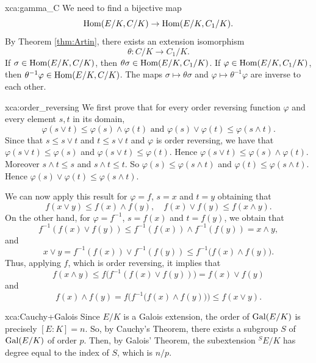 \begin{sol}{xca:gamma_C}
We need to find a bijective map 
\[
\operatorname{Hom}(E/K,C/K)\to\operatorname{Hom}(E/K,C_1/K).
\]
By Theorem \ref{thm:Artin}, there exists an extension isomorphism 
\[
  \theta:C/K \to C_1/K. 
\]
If $\sigma\in\operatorname{Hom}(E/K,C/K)$, then $\theta\sigma\in\operatorname{Hom}(E/K,C_1/K)$. 
If $\varphi\in\operatorname{Hom}(E/K,C_1/K)$, then $\theta^{-1}\varphi\in\operatorname{Hom}(E/K,C/K)$. The 
maps $\sigma\mapsto\theta\sigma$ and 
$\varphi\mapsto\theta^{-1}\varphi$ are inverse to each other. 
\end{sol}

\begin{sol}{xca:order_reversing}
    We first prove that for every order
    reversing function $\varphi$
    and every element $s,t$ in its domain,
    \[
    \varphi(s\vee t)\leq \varphi(s)\wedge \varphi(t) \text{ and }
    \varphi(s)\vee \varphi(t)\leq \varphi(s\wedge t).
    \]
    Since that $s\leq s\vee t$
    and $t\leq s\vee t$ and $\varphi$
    is order reversing,
    we have that $\varphi(s\vee t)\leq \varphi(s)$ 
    and $\varphi(s\vee t)\leq \varphi(t)$.
    Hence $\varphi(s\vee t)\leq \varphi(s)\wedge \varphi(t).$
    Moreover $s\wedge t\leq s$
    and $s\wedge t\leq t$.
    So $\varphi(s)\leq \varphi(s\wedge t)$ and $\varphi(t)\leq \varphi(s\wedge t)$.
    Hence 
    $\varphi(s)\vee \varphi(t)\leq \varphi(s\wedge t).$

    We can now apply this result
    for $\varphi=f$, $s=x$ and $t=y$
    obtaining that
    \[
    f(x\vee y)\leq f(x)\wedge f(y), \quad
    f(x)\vee f(y)\leq f(x\wedge y).
    \]
    On the other hand, for $\varphi=f^{-1}$, 
    $s=f(x)$ and $t=f(y)$,
    we obtain that 
    \[
    f^{-1}(f(x)\vee f(y))\leq
    f^{-1}(f(x))\wedge f^{-1}(f(y))=
    x\wedge y,
    \]
    and
    \[
    x\vee y=f^{-1}(f(x))\vee f^{-1}(f(y))\leq f^{-1}\big(f(x)\wedge f(y)\big).
    \]
    Thus, applying $f$, which is order reversing,
    it implies that 
    \[
    f(x\wedge y)\leq f\big(f^{-1}(f(x)\vee f(y))\big)=
    f(x)\vee f(y)
    \]
    and
    \[
    f(x)\wedge f(y)=f\big(f^{-1}\big(f(x)\wedge f(y)\big)\big)\leq f(x\vee y).
    \]
 \end{sol}

 \begin{sol}{xca:Cauchy+Galois}
     Since $E/K$ is a Galois extension,
     the order of $\operatorname{Gal}(E/K)$ is precisely $[E:K]=n$.
     So, by Cauchy's Theorem, there exists a subgroup $S$ 
     of $\operatorname{Gal}(E/K)$
     of order $p$.
     Then, by Galois' Theorem, the subextension
     ${}^SE/K$
     has degree equal to the index of $S$,
     which is $n/p$.
 \end{sol}

